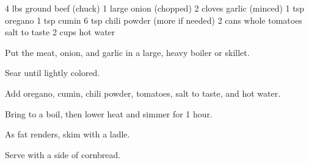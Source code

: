 \dishtype{\main}
\begin{ingreds}
    4 lbs ground beef (chuck)
    1 large onion (chopped)
    2 cloves garlic (minced)
    1 tsp oregano
    1 tsp cumin
    6 tsp chili powder (more if needed)
    2 cans whole tomatoes
    salt to taste
    2 cups hot water
\end{ingreds}
\begin{method}
    Put the meat, onion, and garlic in a large, heavy boiler or skillet.\par
    Sear until lightly colored.\par
    Add oregano, cumin, chili powder, tomatoes, salt to taste, and hot water.\par
    Bring to a boil, then lower heat and simmer for 1 hour.\par
    As fat renders, skim with a ladle.\par
    Serve with a side of cornbread.
\end{method}